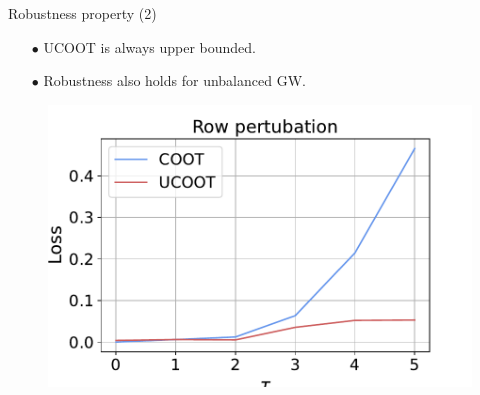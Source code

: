\documentclass{beamer}
\begin{document}
\begin{frame}{Robustness property (2)}
\begin{minipage}[t]{0.6\linewidth}
  \begin{itemize}
    \item[$\bullet$] UCOOT is always upper bounded.
    \item[$\bullet$] Robustness also holds for unbalanced GW.
  \end{itemize}
\end{minipage}%
\hfill%
\hspace{-6cm}
\begin{minipage}[t]{0.47\linewidth}
  \vspace{-0.3cm}
  \begin{figure}
    \centering
    \includegraphics[width=1.05\linewidth, keepaspectratio=true]{SIMPAS/robustness_2.pdf}
  \end{figure}
\end{minipage}


\end{frame}
\end{document}
